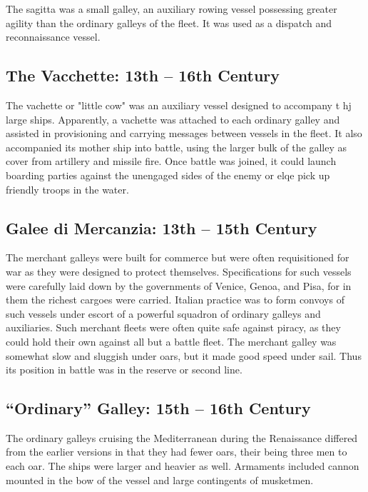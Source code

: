\documentclass{article}
\begin{document}
\begin{multicols}{3}
The sagitta was a small galley, an auxiliary rowing vessel possessing
greater agility than the ordinary galleys of the fleet.  It was used
as a dispatch and reconnaissance vessel.

\subsection{The Vacchette:  13th -- 16th Century}

The vachette or "little cow" was an auxiliary vessel designed to
accompany t hj large ships.  Apparently, a vachette was attached to
each ordinary galley and assisted in provisioning and carrying
messages between vessels in the fleet.  It also accompanied its mother
ship into battle, using the larger bulk of the galley as cover from
artillery and missile fire.  Once battle was joined, it could launch
boarding parties against the unengaged sides of the enemy or elqe pick
up friendly troops in the water.

\subsection{Galee di Mercanzia:  13th -- 15th Century}

The merchant galleys were built for commerce but were often
requisitioned for war as they were designed to protect themselves.
Specifications for such vessels were carefully laid down by the
governments of Venice, Genoa, and Pisa, for in them the richest
cargoes were carried.  Italian practice was to form convoys of such
vessels under escort of a powerful squadron of ordinary galleys and
auxiliaries. Such merchant fleets were often quite safe against
piracy, as they could hold their own against all but a battle fleet.
The merchant galley was somewhat slow and sluggish under oars, but it
made good speed under sail.  Thus its position in battle was in the
reserve or second line.

\subsection{``Ordinary'' Galley:  15th -- 16th Century}

The ordinary galleys cruising the Mediterranean during the Renaissance
differed from the earlier versions in that they had fewer oars, their
being three men to each oar.  The ships were larger and heavier as
well.  Armaments included cannon mounted in the bow of the vessel and
large contingents of musketmen.


\end{multicols}
\end{document}
